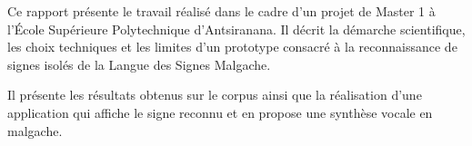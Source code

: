 \begin{avantpropos}

Ce rapport présente le travail réalisé dans le cadre d'un projet de Master 1 à l'École Supérieure Polytechnique d'Antsiranana. Il décrit la démarche scientifique, les choix techniques et les limites d'un prototype consacré à la reconnaissance de signes isolés de la Langue des Signes Malgache.

Il présente les résultats obtenus sur le corpus ainsi que la réalisation d'une application qui affiche le signe reconnu et en propose une synthèse vocale en malgache.

\end{avantpropos}
